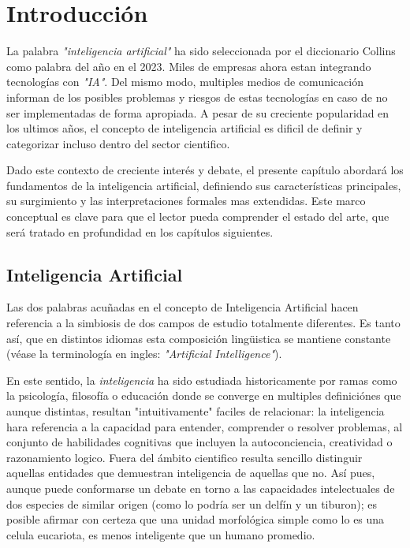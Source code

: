 \chapter{Introducción}

La palabra \emph{"inteligencia artificial"} ha sido seleccionada por el
diccionario Collins como palabra del año en el 2023. Miles de empresas ahora
estan integrando tecnologías con \emph{"IA"}. Del mismo modo, multiples medios
de comunicación informan de los posibles problemas y riesgos de estas
tecnologías en caso de no ser implementadas de forma apropiada. A pesar de su
creciente popularidad en los ultimos años, el concepto de inteligencia
artificial es dificil de definir y categorizar incluso dentro del sector
cientifico.

Dado este contexto de creciente interés y debate, el presente capítulo abordará
los fundamentos de la inteligencia artificial, definiendo sus características
principales, su surgimiento y las interpretaciones formales mas extendidas. Este
marco conceptual es clave para que el lector pueda comprender el estado del
arte, que será tratado en profundidad en los capítulos siguientes.

\section{Inteligencia Artificial}
\label{sec:artificial_intelligence}
Las dos palabras acuñadas en el concepto de Inteligencia Artificial hacen
referencia a la simbiosis de dos campos de estudio totalmente diferentes. Es
tanto así, que en distintos idiomas esta composición lingüistica se mantiene
constante (véase la terminología en ingles: \emph{"Artificial Intelligence"}).

En este sentido, la \emph{inteligencia} ha sido estudiada historicamente por
ramas como la psicología, filosofía o educación donde se converge en multiples
definiciónes que aunque distintas, resultan "intuitivamente" faciles de
relacionar: la inteligencia hara referencia a la capacidad para entender,
comprender o resolver problemas, al conjunto de habilidades cognitivas que
incluyen la autoconciencia, creatividad o razonamiento logico. Fuera del ámbito
cientifico resulta sencillo distinguir aquellas entidades que demuestran
inteligencia de aquellas que no. Así pues, aunque puede conformarse un debate en
torno a las capacidades intelectuales de dos especies de similar origen (como lo
podría ser un delfín y un tiburon); es posible afirmar con certeza que una
unidad morfológica simple como lo es una celula eucariota, es menos inteligente
que un humano promedio.

